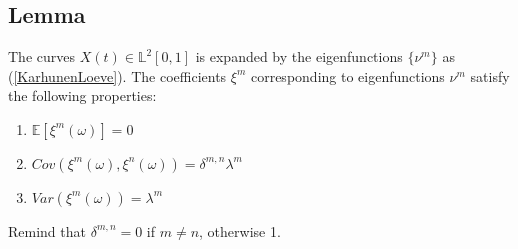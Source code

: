 \documentclass[11pt,twoside,a4paper]{article}
\begin{document}
	\subsection{Lemma} \label{Proof1}
	The curves $X(t) \in \mathbb{L}^2[0,1]$ is expanded by the eigenfunctions $\{\nu^m\}$ as (\ref{KarhunenLoeve}). The coefficients $\xi^{m}$ corresponding to eigenfunctions $\nu^m$ satisfy the following properties:
	\begin{enumerate}
		\item $\mathbb{E}\left[\xi^m(\omega)\right] = 0$
		\item $Cov\left(\xi^m(\omega), \xi^n(\omega)\right) = \delta^{m,n}\lambda^m$%
		\item $Var\left(\xi^m(\omega)\right) = \lambda^m$
	\end{enumerate}
	Remind that $\delta^{m,n} = 0$ if $m \neq n$, otherwise 1.
\end{document}
